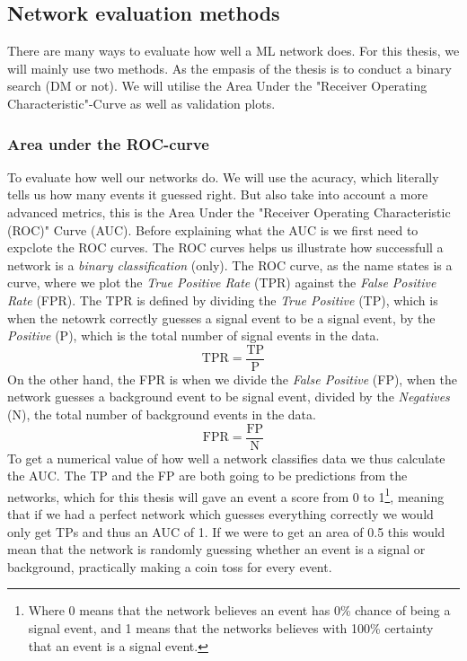 \documentclass[14pt, a4paper]{book}
\begin{document}
\subsection{Network evaluation methods}
There are many ways to evaluate how well a ML network does. For this thesis, we will mainly use two methods. As the empasis of the thesis is to conduct a binary search (DM or not). We will utilise the Area Under the "Receiver Operating Characteristic"-Curve as well as validation plots.


\subsubsection{Area under the ROC-curve}
To evaluate how well our networks do. We will use the acuracy, which literally tells us how many events it guessed right. But also take into account a more advanced metrics, this is the Area Under the "Receiver Operating Characteristic (ROC)" Curve (AUC). 
Before explaining what the AUC is we first need to expclote the ROC curves. The ROC curves helps us illustrate how successfull a network is a \textit{binary classification} (only). The ROC curve, as the name states is a curve, where we plot the \textit{True Positive Rate} (TPR) against 
the \textit{False Positive Rate} (FPR). The TPR is defined by dividing the \textit{True Positive} (TP), which is when the netowrk correctly guesses a signal event to be a signal event, by the \textit{Positive} (P), which is the total number of signal events in the data. 
$$
\text{TPR} =\frac{\text{TP}}{\text{P}}
$$
On the other hand, the FPR is when we divide the \textit{False Positive} (FP), when the network guesses a background event to be signal event, divided by the \textit{Negatives} (N), the total number of background events in the data.
$$
\text{FPR} =\frac{\text{FP}}{\text{N}}
$$
To get a numerical value of how well a network classifies data we thus calculate the AUC. The TP and the FP are both going to be predictions from the networks, which for this thesis will gave an event a score from 0 to 1\footnote{Where 0 means that the network believes an event has 0\% chance of being a signal event, and 1 means that the networks believes with 100\% certainty that an event is a signal event.}, 
meaning that if we had a perfect network which guesses everything correctly we would only get TPs and thus an AUC of 1. If we were to get an area of 0.5 this would mean that the network is randomly guessing whether an event is a signal or background, practically making a coin toss for every event. 
\end{document}
